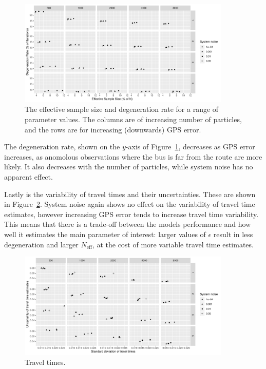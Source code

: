 \begin{figure}[tb]
    \centering
    \includegraphics[width=0.9\textwidth]{figures/04_model_results_degen.pdf}
    \caption{The effective sample size and degeneration rate for a range of parameter 
        values. The columns are of increasing number of particles,
        and the rows are for increasing (downwards) GPS error.}
    \label{fig:degen_rate}
\end{figure}

The degeneration rate, 
shown on the $y$-axis of Figure~\ref{fig:degen_rate},
decreases as GPS error increases,
as anomolous observations where the bus is far from the route
are more likely.
It also decreases with the number of particles,
while system noise has no apparent effect.


Lastly is the variability of travel times and their uncertainties.
These are shown in Figure~\ref{fig:travel_times}.
System noise again shows no effect on the variability of travel time estimates,
however increasing GPS error tends to increase travel time variability.
This means that there is a trade-off between the models performance
and how well it estimates the main parameter of interest:
larger values of $\epsilon$ result in less degeneration and larger $N_\text{eff}$,
at the cost of more variable travel time estimates.


\begin{figure}[tb]
    \centering
    \includegraphics[width=0.9\textwidth]{figures/04_model_results_times.pdf}
    \caption{Travel times.}
    \label{fig:travel_times}
\end{figure}


